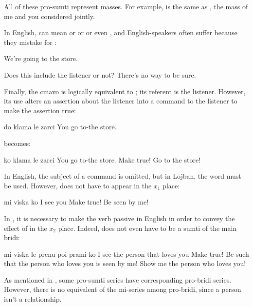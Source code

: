 All of these pro-sumti represent masses. For example, 
    is the same as , the mass of me and you considered
    jointly. 

In English,  can mean  or  or 
    or even , and English-speakers often suffer because
    they mistake  for :
\begin{example}
We're going to the store.
\end{example}

Does this include the listener or not? There's no way to be
    sure.

Finally, the cmavo  is logically equivalent to ;
    its referent is the listener. However, its use alters an
    assertion about the listener into a command to the listener to
    make the assertion true:
\begin{example}
do klama le zarci\n
You go to-the store.
\end{example}

{\noindent}becomes:
\begin{example}
ko klama le zarci\n
You  go to-the store.\n
Make  true!\n
Go to the store!
\end{example}

In English, the subject of a command is omitted, but in Lojban,
    the word  must be used. However,  does not have to
    appear in the $x_1$ place:
\begin{example}
mi viska ko\n
I see you \n
Make  true!\n
Be seen by me!
\end{example}

In , it is necessary to make the
    verb passive in English in order to convey the effect of 
    in the $x_2$ place. Indeed,  does not even have to be a
    sumti of the main bridi:
\begin{example}
mi viska le prenu poi prami ko\n
I see the person that loves you \n
Make  true!\n
Be such that the person who loves you is seen by me!\n
Show me the person who loves you!
\end{example}

As mentioned in , some pro-sumti
    series have corresponding pro-bridi series. However, there is
    no equivalent of the mi-series among pro-bridi, since a person
    isn't a relationship.



